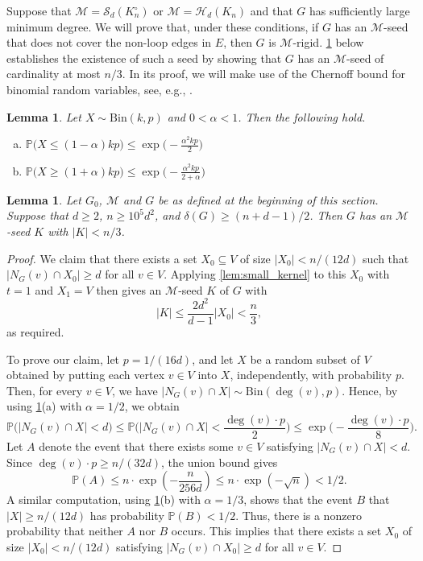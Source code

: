 \documentclass[11pt,a4paper,dvipsnames]{scrartcl}
\newtheorem{lemma}[theorem]{Lemma}
\newcommand{\cS}{{\mathcal{S}}}
\newcommand{\cH}{{\mathcal{H}}}
\newcommand{\cM}{{\mathcal{M}}}
\newcommand{\Prob}{\mathbb{P}}
\begin{document}
Suppose that $\cM = \cS_d(K_n^\circ)$ or $\cM = \cH_d(K_n)$ and that $G$ has sufficiently large minimum degree.
We will prove that, under these conditions, if $G$ has an $\cM$-seed that does not cover the non-loop edges in $E$, then $G$ is $\cM$-rigid. \cref{lem:existsk:mindegree} below establishes the existence of such a seed by showing that $G$ has an $\cM$-seed of cardinality at most $n/3$.
In its proof, we will make use of the Chernoff bound for binomial random variables, see, e.g., \cite[Theorem 2.1]{janson2011random}.
\begin{lemma}\label{chernoff}
    Let $X\sim {\mathrm{Bin}}(k,p)$ and $0<\alpha<1$. Then the following hold.
    \begin{enumerate}[(a)]
        \item $\Prob\big(X\leq (1-\alpha) kp\big)\leq \exp \big(-\frac{\alpha^2 kp}{2}\big)$
        \item $\Prob\big(X\geq (1+\alpha) kp\big)\leq \exp \big(-\frac{\alpha^2 kp}{2+\alpha}\big)$
    \end{enumerate}
    
\end{lemma}


\begin{lemma}\label{lem:existsk:mindegree}
    Let $G_0$, $\cM$ and $G$ be as defined at the beginning of this section. Suppose that $d\geq2$, $n\geq 10^5 d^2$, and  $\delta(G)\geq (n+d-1)/2$. Then $G$ has an $\cM$-seed $K$ with $|K|< n/3$.
\end{lemma}
\begin{proof}
     We claim that 
     there exists a set $X_0\subseteq V$ of size $|X_0|< n/(12d)$ such that $|N_G(v)\cap X_0|\geq d$ for all $v\in V$.    Applying
     \cref{lem:small_kernel} to this $X_0$ with  $t=1$ and $X_1=V$ then gives an $\cM$-seed $K$ of $G$ with
    \[ |K|\leq \frac{2d^2}{d-1}|X_0|<  \frac{n}{3}, \]
    as required.
    
    To prove our claim, let $p=1/(16d)$, and let $X$ be a random subset of $V$ obtained by putting each vertex $v\in V$ into $X$, independently,  with probability $p$. 
    Then, for every $v\in V$, we have $|N_G(v)\cap X|\sim {\mathrm{Bin}}(\deg(v),p)$. Hence, by using \cref{chernoff}(a) with $\alpha = 1/2$, we obtain
    $$ \Prob\Big(|N_G(v)\cap X|<d\Big)\leq \Prob\Big(|N_G(v)\cap X|<\frac{\deg(v)\cdot p}{2}\Big)\leq \exp\Big(-\frac{\deg(v)\cdot p}{8}\Big).$$
    Let $A$ denote the event that there exists some $v\in V$ satisfying $|N_G(v)\cap X|<d$. Since $\deg(v)\cdot p\geq n/(32d)$, the union bound gives \[\Prob(A)\leq n\cdot\exp\left(-\frac{n}{256d}\right)\leq n\cdot\exp\left(-\sqrt n\right) <1/2.\] 
    A similar computation, using \cref{chernoff}(b) with $\alpha = 1/3$, shows that the event $B$ that $|X|\geq n/(12d)$ has probability $\Prob(B)<1/2$. Thus, there is a nonzero probability that neither $A$ nor $B$ occurs. This implies that there exists a set $X_0$ of size $|X_0|< n/(12d)$ satisfying $|N_G(v)\cap X_0|\geq d$ for all $v\in V$. 
\end{proof}
\end{document}
